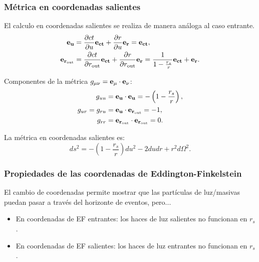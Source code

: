\subsubsection{Métrica en coordenadas salientes}
El calculo en coordenadas salientes se realiza de manera análoga al caso entrante.
\begin{equation}
    \begin{aligned}
        \mathbf{e_u   }             & = \frac{\partial ct}{\partial u} \mathbf{e_{ct}} + \frac{\partial r}{\partial u} \mathbf{e_r} = \mathbf{e_{ct}},                                                                 \\
        \mathbf{e_{r_{\text{out}}}} & = \frac{\partial ct}{\partial r_{\text{out}}} \mathbf{e_{ct}} + \frac{\partial r}{\partial r_{\text{out}}} \mathbf{e_r} = \frac{1}{1 - \frac{r_s}{r}} \mathbf{e_{ct}} + \mathbf{e_r}.
    \end{aligned}
\end{equation}

Componentes de la métrica \( g_{\mu\nu} = \mathbf{e_\mu} \cdot \mathbf{e_\nu} \):
\begin{equation}
    \begin{aligned}
        g_{uu}          & = \mathbf{e_u} \cdot \mathbf{e_u} = -\left(1 - \frac{r_s}{r}\right), \\
        g_{ur} = g_{ru} & = \mathbf{e_u} \cdot \mathbf{e_{r_{\text{out}}}} = -1,               \\
        g_{rr}          & = \mathbf{e_{r_{\text{out}}}} \cdot \mathbf{e_{r_{\text{out}}}} = 0.
    \end{aligned}
\end{equation}

La métrica en coordenadas salientes es:
\begin{equation}
    ds^2 = -\left(1 - \frac{r_s}{r}\right) du^2 - 2 du dr + r^2 d\Omega^2.
\end{equation}

\subsubsection{Propiedades de las coordenadas de Eddington-Finkelstein}
El cambio de coordenadas permite mostrar que las partículas de luz/masivas puedan pasar a través del horizonte de eventos, pero...
\begin{itemize}
    \item En coordenadas de EF entrantes: los haces de luz salientes no funcionan en $r_s$.
    \item En coordenadas de EF salientes: los haces de luz entrantes no funcionan en $r_s$.
\end{itemize}


